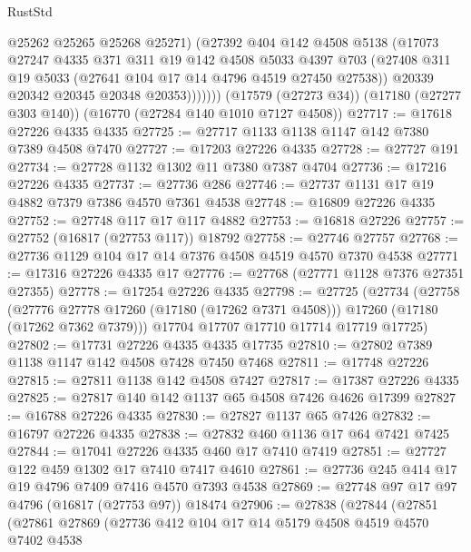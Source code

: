 \begin{lexlean}{RustStd}
\begin{coremodule}
                @25262
                @25265
                @25268
                @25271)
              (@27392
                @404
                @142
                @4508
                @5138
                (@17073
                  @27247
                  @4335
                  @371
                  @311
                  @19
                  @142
                  @4508
                  @5033
                  @4397
                  @703
                  (@27408 @311 @19 @5033 (@27641 @104 @17 @14 @4796 @4519 @27450 @27538))
                  @20339
                  @20342
                  @20345
                  @20348
                  @20353)))))))
    (@17579 (@27273 @34))
    (@17180 (@27277 @303 @140))
    (@16770 (@27284 @140 @1010 @7127 @4508))
@27717 := @17618 @27226 @4335 @4335
@27725 := @27717 @1133 @1138 @1147 @142 @7380 @7389 @4508 @7470
@27727 := @17203 @27226 @4335
@27728 := @27727 @191
@27734 := @27728 @1132 @1302 @11 @7380 @7387 @4704
@27736 := @17216 @27226 @4335
@27737 := @27736 @286
@27746 := @27737 @1131 @17 @19 @4882 @7379 @7386 @4570 @7361 @4538
@27748 := @16809 @27226 @4335
@27752 := @27748 @117 @17 @117 @4882
@27753 := @16818 @27226
@27757 := @27752 (@16817 (@27753 @117)) @18792
@27758 := @27746 @27757
@27768 := @27736 @1129 @104 @17 @14 @7376 @4508 @4519 @4570 @7370 @4538
@27771 := @17316 @27226 @4335 @17
@27776 := @27768 (@27771 @1128 @7376 @27351 @27355)
@27778 := @17254 @27226 @4335
@27798 := @27725
    (@27734
      (@27758
        (@27776 @27778 @17260 (@17180 (@17262 @7371 @4508)))
        @17260
        (@17180 (@17262 @7362 @7379)))
      @17704
      @17707
      @17710
      @17714
      @17719
      @17725)
@27802 := @17731 @27226 @4335 @4335 @17735
@27810 := @27802 @7389 @1138 @1147 @142 @4508 @7428 @7450 @7468
@27811 := @17748 @27226
@27815 := @27811 @1138 @142 @4508 @7427
@27817 := @17387 @27226 @4335
@27825 := @27817 @140 @142 @1137 @65 @4508 @7426 @4626 @17399
@27827 := @16788 @27226 @4335
@27830 := @27827 @1137 @65 @7426
@27832 := @16797 @27226 @4335
@27838 := @27832 @460 @1136 @17 @64 @7421 @7425
@27844 := @17041 @27226 @4335 @460 @17 @7410 @7419
@27851 := @27727 @122 @459 @1302 @17 @7410 @7417 @4610
@27861 := @27736 @245 @414 @17 @19 @4796 @7409 @7416 @4570 @7393 @4538
@27869 := @27748 @97 @17 @97 @4796 (@16817 (@27753 @97)) @18474
@27906 := @27838
    (@27844
      (@27851
        (@27861
          @27869
          (@27736
            @412
            @104
            @17
            @14
            @5179
            @4508
            @4519
            @4570
            @7402
            @4538

\end{coremodule}
\end{lexlean}
